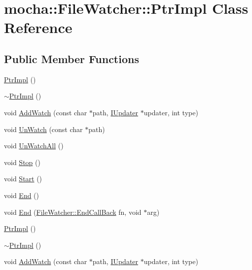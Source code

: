 \hypertarget{classmocha_1_1_file_watcher_1_1_ptr_impl}{
\section{mocha::FileWatcher::PtrImpl Class Reference}
\label{classmocha_1_1_file_watcher_1_1_ptr_impl}
}
\subsection*{Public Member Functions}
\begin{DoxyCompactItemize}
\item 
\hyperlink{classmocha_1_1_file_watcher_1_1_ptr_impl_abd9d31fe45441698d2a782ffb33e5d02}{PtrImpl} ()
\item 
\hyperlink{classmocha_1_1_file_watcher_1_1_ptr_impl_a9a34b0b1c7f148ddafd04faa3448bc3b}{$\sim$PtrImpl} ()
\item 
void \hyperlink{classmocha_1_1_file_watcher_1_1_ptr_impl_a29b1776db81f039ff3d397adb516d907}{AddWatch} (const char $\ast$path, \hyperlink{classmocha_1_1_i_updater}{IUpdater} $\ast$updater, int type)
\item 
void \hyperlink{classmocha_1_1_file_watcher_1_1_ptr_impl_ad0aca11b5dffced71385d0b40bf4a060}{UnWatch} (const char $\ast$path)
\item 
void \hyperlink{classmocha_1_1_file_watcher_1_1_ptr_impl_ad5bbbb2993eb3661ec94154a4fe0a448}{UnWatchAll} ()
\item 
void \hyperlink{classmocha_1_1_file_watcher_1_1_ptr_impl_adcf4783a26e4dd2ab797dbb790087012}{Stop} ()
\item 
void \hyperlink{classmocha_1_1_file_watcher_1_1_ptr_impl_a61d2ff449e422799e8554fca888663e4}{Start} ()
\item 
void \hyperlink{classmocha_1_1_file_watcher_1_1_ptr_impl_ab68659e2a0445d58e1df7af1ed3280ca}{End} ()
\item 
void \hyperlink{classmocha_1_1_file_watcher_1_1_ptr_impl_ae132bbd9089fec4183743bf2f3d90113}{End} (\hyperlink{classmocha_1_1_file_watcher_af774b8dd436b9f8929506466533831b9}{FileWatcher::EndCallBack} fn, void $\ast$arg)
\item 
\hyperlink{classmocha_1_1_file_watcher_1_1_ptr_impl_abd9d31fe45441698d2a782ffb33e5d02}{PtrImpl} ()
\item 
\hyperlink{classmocha_1_1_file_watcher_1_1_ptr_impl_a9a34b0b1c7f148ddafd04faa3448bc3b}{$\sim$PtrImpl} ()
\item 
void \hyperlink{classmocha_1_1_file_watcher_1_1_ptr_impl_a29b1776db81f039ff3d397adb516d907}{AddWatch} (const char $\ast$path, \hyperlink{classmocha_1_1_i_updater}{IUpdater} $\ast$updater, int type)

\end{DoxyCompactItemize}
